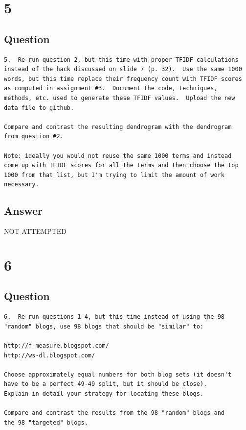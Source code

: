 \documentclass[letterpaper,11pt]{article}
\begin{document}
\clearpage


\section*{5}

\subsection*{Question}

\begin{verbatim}
5.  Re-run question 2, but this time with proper TFIDF calculations
instead of the hack discussed on slide 7 (p. 32).  Use the same 1000
words, but this time replace their frequency count with TFIDF scores
as computed in assignment #3.  Document the code, techniques,
methods, etc. used to generate these TFIDF values.  Upload the new
data file to github.

Compare and contrast the resulting dendrogram with the dendrogram
from question #2.

Note: ideally you would not reuse the same 1000 terms and instead
come up with TFIDF scores for all the terms and then choose the top
1000 from that list, but I'm trying to limit the amount of work
necessary.
\end{verbatim}

\subsection*{Answer}

\begin{center}
\Huge{NOT ATTEMPTED}
\end{center}


\clearpage


\section*{6}

\subsection*{Question}

\begin{verbatim}
6.  Re-run questions 1-4, but this time instead of using the 98 
"random" blogs, use 98 blogs that should be "similar" to:

http://f-measure.blogspot.com/
http://ws-dl.blogspot.com/

Choose approximately equal numbers for both blog sets (it doesn't
have to be a perfect 49-49 split, but it should be close).  
Explain in detail your strategy for locating these blogs.  

Compare and contrast the results from the 98 "random" blogs and 
the 98 "targeted" blogs. 
\end{verbatim}
\end{document}

